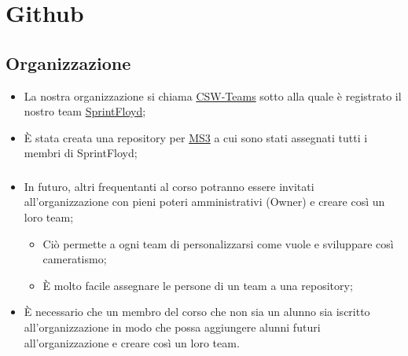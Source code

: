 \documentclass[compress]{beamer}
\begin{document}
    
\begin{frame}[plain]
    \titlepage
\end{frame}

\section{Github}
\subsection{Organizzazione}
\begin{frame}{\subsecname}
    \begin{itemize}
        \item La nostra organizzazione si chiama \href{https://github.com/CSW-Teams}{CSW-Teams}
        sotto alla quale è registrato il nostro team \href{https://github.com/orgs/CSW-Teams/teams/sprintfloyd}{SprintFloyd};
        \item È stata creata una repository per \href{https://github.com/CSW-Teams/MS3}{MS3}
        a cui sono stati assegnati tutti i membri di SprintFloyd;
    \end{itemize}
\end{frame}
\begin{frame}
    \frametitle{\subsecname}
    \begin{itemize}
        \item In futuro, altri frequentanti al corso potranno essere invitati
        all'organizzazione con pieni poteri amministrativi (Owner) e creare così un loro
        team;
        \begin{itemize}
            \item[\checkmark] Ciò permette a ogni team di personalizzarsi come vuole e sviluppare così cameratismo;
            \item[\checkmark] È molto facile assegnare le persone di un team a una repository;   
        \end{itemize}
        \item È necessario che un membro del corso che non sia un alunno sia iscritto all'organizzazione in modo
        che possa aggiungere alunni futuri all'organizzazione e creare così un loro team.
    \end{itemize}
\end{frame}
\end{document}
